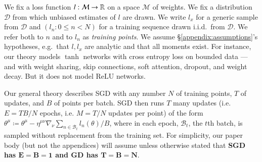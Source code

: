 \documentclass{article}
\theoremstyle{plain}
\theoremstyle{definition}
\newcommand{\Bb}{\mathcal{B}}
\newcommand{\Dd}{\mathcal{D}}
\newcommand{\Mm}{\mathcal{M}}
\begin{document}



        We fix a loss function $l:\Mm\to\RR$ on a space $\Mm$ of weights.  We
        fix a distribution $\Dd$ from which unbiased estimates of $l$ are
        drawn.  We write $l_x$ for a generic sample from $\Dd$ and $(l_n: 0\leq
        n<N)$ for a training sequence drawn i.i.d.\ from $\Dd$.  We refer both
        to $n$ and to $l_n$ as \emph{training points}.  We assume
        \S\ref{appendix:assumptions}'s hypotheses, e.g.\ that $l, l_x$ are
        analytic and that all moments exist.
        For instance, our theory models $\tanh$ networks with cross entropy
        loss on bounded data --- and with weight sharing, skip connections,
        soft attention, dropout, and weight decay.  But it does not model
        $\text{ReLU}$ networks.
        

        Our general theory describes SGD with any number
             $N$ of training points,
             $T$ of updates, and 
             $B$ of points per batch.
        SGD then runs $T$ many updates (i.e. $E=TB/N$ epochs, i.e. $M=T/N$
        updates per point) of the form
        $
            \theta^\mu
            \coloneqq
            \theta^\mu -
            \eta^{\mu\nu} \nabla_\nu
                \sum_{n\in \Bb_t} l_n(\theta) / B
        $,
        where in each epoch, $\Bb_t$, the $t$th batch, is sampled without
        replacement from the training set.
        For simplicity, our paper body (but not the appendices) will assume
        unless otherwise stated that \textbf{SGD has $\mathbf{E=B=1}$ and GD
        has $\mathbf{T=B=N}$}.
\end{document}
